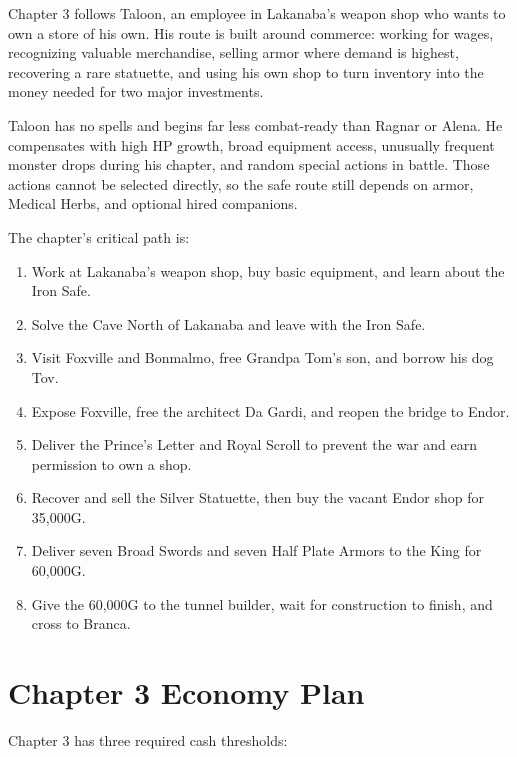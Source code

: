 \documentclass[
  american,
  10pt,
  letterpaper,
  oneside,
  open=any]{scrreprt}
\providecommand{\tightlist}{%
  \setlength{\itemsep}{0pt}\setlength{\parskip}{0pt}}
\begin{document}
Chapter 3 follows Taloon, an employee in Lakanaba's weapon shop who
wants to own a store of his own. His route is built around commerce:
working for wages, recognizing valuable merchandise, selling armor where
demand is highest, recovering a rare statuette, and using his own shop
to turn inventory into the money needed for two major investments.

Taloon has no spells and begins far less combat-ready than Ragnar or
Alena. He compensates with high HP growth, broad equipment access,
unusually frequent monster drops during his chapter, and random special
actions in battle. Those actions cannot be selected directly, so the
safe route still depends on armor, Medical Herbs, and optional hired
companions.

The chapter's critical path is:

\begin{enumerate}
\def\labelenumi{\arabic{enumi}.}
\tightlist
\item
  Work at Lakanaba's weapon shop, buy basic equipment, and learn about
  the Iron Safe.
\item
  Solve the Cave North of Lakanaba and leave with the Iron Safe.
\item
  Visit Foxville and Bonmalmo, free Grandpa Tom's son, and borrow his
  dog Tov.
\item
  Expose Foxville, free the architect Da Gardi, and reopen the bridge to
  Endor.
\item
  Deliver the Prince's Letter and Royal Scroll to prevent the war and
  earn permission to own a shop.
\item
  Recover and sell the Silver Statuette, then buy the vacant Endor shop
  for 35,000G.
\item
  Deliver seven Broad Swords and seven Half Plate Armors to the King for
  60,000G.
\item
  Give the 60,000G to the tunnel builder, wait for construction to
  finish, and cross to Branca.
\end{enumerate}

\section{Chapter 3 Economy Plan}\label{chapter-3-economy-plan}

Chapter 3 has three required cash thresholds:
\end{document}
